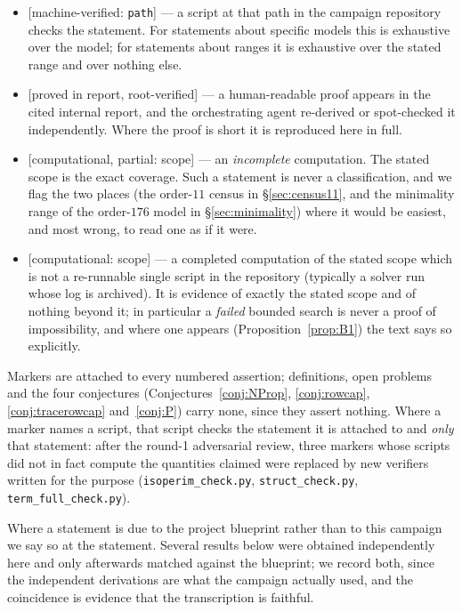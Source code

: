 \documentclass[11pt]{article}
\theoremstyle{plain}
\theoremstyle{definition}
\theoremstyle{remark}
\numberwithin{equation}{section}
\newcommand{\statusbox}[1]{{\small\sloppy\textsf{[#1]}}}
\newcommand{\MV}[1]{\statusbox{machine-verified: \texttt{#1}}}
\newcommand{\PROVED}[1]{\statusbox{proved in #1, root-verified}}
\newcommand{\PARTIAL}[1]{\statusbox{computational, partial: #1}}
\newcommand{\COMP}[1]{\statusbox{computational: #1}}
\begin{document}
\begin{itemize}
\item \MV{path} --- a script at that path in the campaign repository checks the statement.
For statements about specific models this is exhaustive over the model; for statements about
ranges it is exhaustive over the stated range and over nothing else.
\item \PROVED{report} --- a human-readable proof appears in the cited internal report, and
the orchestrating agent re-derived or spot-checked it independently. Where the proof is short
it is reproduced here in full.
\item \PARTIAL{scope} --- an \emph{incomplete} computation. The stated scope is the exact
coverage. Such a statement is never a classification, and we flag the two places
(the order-$11$ census in \S\ref{sec:census11}, and the minimality range of the order-$176$
model in \S\ref{sec:minimality}) where it would be easiest, and most wrong, to read one as
if it were.
\item \COMP{scope} --- a completed computation of the stated scope which is not a
re-runnable single script in the repository (typically a solver run whose log is archived).
It is evidence of exactly the stated scope and of nothing beyond it; in particular a
\emph{failed} bounded search is never a proof of impossibility, and where one appears
(Proposition~\ref{prop:B1}) the text says so explicitly.
\end{itemize}

Markers are attached to every numbered assertion; definitions, open problems and the four
conjectures (Conjectures~\ref{conj:NProp}, \ref{conj:rowcap}, \ref{conj:tracerowcap}
and~\ref{conj:P}) carry none, since they assert nothing. Where a marker names a script, that script
checks the statement it is attached to and \emph{only} that statement: after the round-1
adversarial review, three markers whose scripts did not in fact compute the quantities
claimed were replaced by new verifiers written for the purpose
(\texttt{isoperim\_check.py}, \texttt{struct\_check.py}, \texttt{term\_full\_check.py}).

Where a statement is due to the project blueprint \cite{blueprint} rather than to this
campaign we say so at the statement. Several results below were obtained independently here
and only afterwards matched against the blueprint; we record both, since the independent
derivations are what the campaign actually used, and the coincidence is evidence that the
transcription is faithful.
\end{document}
